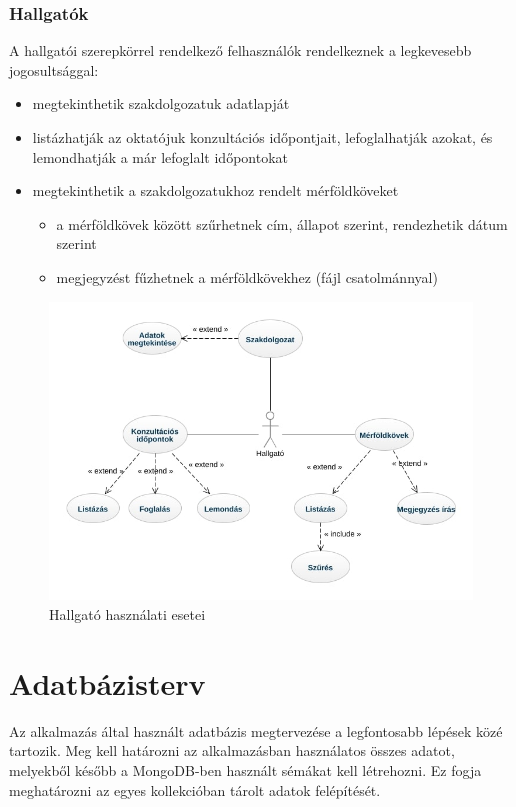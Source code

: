 \documentclass[
]{thesis-ekf}
\theoremstyle{definition}
\theoremstyle{remark}
\begin{document}
	\subsubsection{Hallgatók}
	A hallgatói szerepkörrel rendelkező felhasználók rendelkeznek a legkevesebb jogosultsággal:
	\begin{itemize}
		\item megtekinthetik szakdolgozatuk adatlapját
		\item listázhatják az oktatójuk konzultációs időpontjait, lefoglalhatják azokat, és lemondhatják a már lefoglalt időpontokat
		\item megtekinthetik a szakdolgozatukhoz rendelt mérföldköveket
		\begin{itemize}
			\item a mérföldkövek között szűrhetnek cím, állapot szerint, rendezhetik dátum szerint
			\item megjegyzést fűzhetnek a mérföldkövekhez (fájl csatolmánnyal)
		\end{itemize}
	\end{itemize}
	\begin{figure}[!h]
		\centering
		\includegraphics[width=12cm]{kepek/hallgato_usecase.jpg}
		\caption{Hallgató használati esetei}
		\label{fig:hallgato_usecase}
	\end{figure}
	\newpage
	\section{Adatbázisterv}
	Az alkalmazás által használt adatbázis megtervezése a legfontosabb lépések közé tartozik. Meg kell határozni az alkalmazásban használatos összes adatot, melyekből később a MongoDB-ben használt sémákat kell létrehozni. Ez fogja meghatározni az egyes kollekcióban tárolt adatok felépítését.
	
\end{document}
